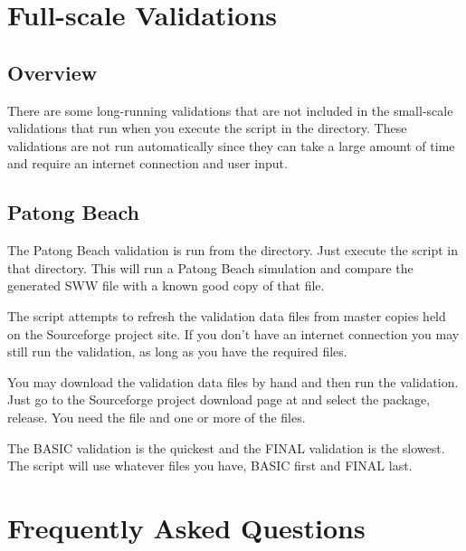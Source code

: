 \documentclass{manual}
\begin{document}

\chapter{\anuga Full-scale Validations}


\section{Overview}

There are some long-running validations that are not included in the small-scale
validations that run when you execute the 
script in the  directory.
These validations are not run automatically since they can take a large amount
of time and require an internet connection and user input.


\section{Patong Beach}

The Patong Beach validation is run from the 
directory.  Just execute the  script in that directory.
This will run a Patong Beach simulation and compare the generated SWW file with a
known good copy of that file.

The script attempts to refresh the validation data files from master copies held
on the Sourceforge project site.  If you don't have an internet connection you
may still run the validation, as long as you have the required files.

You may download the validation data files by hand and then run the validation.
Just go to the \anuga Sourceforge project download page at
 and select
the  package,  release.  You need the
 file and one or more of the 
files.

The BASIC validation is the quickest and the FINAL validation is the slowest.
The  script will use whatever files you have, BASIC first and
FINAL last.


\chapter{Frequently Asked Questions}
\end{document}
